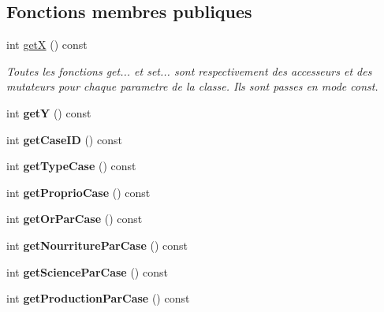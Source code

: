 \subsection*{Fonctions membres publiques}
\begin{DoxyCompactItemize}
\item 
\mbox{\label{classCase_a20c632789e67b8257dfe9acfe1aa0143}} 
int \hyperlink{classCase_a20c632789e67b8257dfe9acfe1aa0143}{getX} () const
\begin{DoxyCompactList}\small\item\em Toutes les fonctions get... et set... sont respectivement des accesseurs et des mutateurs pour chaque parametre de la classe. Ils sont passes en mode const. \end{DoxyCompactList}\item 
\mbox{\label{classCase_ad703df23845fd490865372c5acc53c56}} 
int {\bfseries getY} () const
\item 
\mbox{\label{classCase_af949ff97328842dd7ca389352c9ff3ac}} 
int {\bfseries get\+Case\+ID} () const
\item 
\mbox{\label{classCase_a463d7d00daf14038d7ca7e3199d9f561}} 
int {\bfseries get\+Type\+Case} () const
\item 
\mbox{\label{classCase_a51933ab03ceeb9e1c1fb4d9997066cde}} 
int {\bfseries get\+Proprio\+Case} () const
\item 
\mbox{\label{classCase_a8f52f357d9e0315632b7b2a0f8f703c9}} 
int {\bfseries get\+Or\+Par\+Case} () const
\item 
\mbox{\label{classCase_ad620d008a333fc3941ca7ebc0f3d7a7a}} 
int {\bfseries get\+Nourriture\+Par\+Case} () const
\item 
\mbox{\label{classCase_a0a23d6ee1ed37c903f45ea2100ede0a1}} 
int {\bfseries get\+Science\+Par\+Case} () const
\item 
\mbox{\label{classCase_a3094c8a8d3a0f4aba3cce4d28b0e836c}} 
int {\bfseries get\+Production\+Par\+Case} () const
\item 
\mbox{\label{classCase_a768db9382386062a0fee1abe9460a23e}} 

\end{DoxyCompactItemize}
